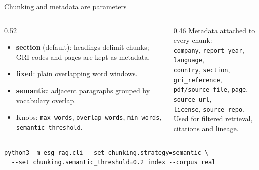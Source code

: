 \documentclass[aspectratio=169]{beamer}
\begin{document}
\begin{frame}[fragile]{Chunking and metadata are parameters}
  \begin{columns}[T]
    \begin{column}{0.52\textwidth}
      \begin{itemize}
        \item \textbf{section} (default): headings delimit chunks; GRI codes and pages are kept as metadata.
        \item \textbf{fixed}: plain overlapping word windows.
        \item \textbf{semantic}: adjacent paragraphs grouped by vocabulary overlap.
        \item Knobs: \texttt{max\_words}, \texttt{overlap\_words}, \texttt{min\_words}, \texttt{semantic\_threshold}.
      \end{itemize}
    \end{column}
    \begin{column}{0.46\textwidth}
      \scriptsize
      Metadata attached to every chunk:\\
      \texttt{company}, \texttt{report\_year}, \texttt{language},\\
      \texttt{country}, \texttt{section}, \texttt{gri\_reference},\\
      \texttt{pdf/source file}, \texttt{page}, \texttt{source\_url},\\
      \texttt{license}, \texttt{source\_repo}.\\
      \vspace{2mm}
      Used for filtered retrieval, citations and lineage.
    \end{column}
  \end{columns}
  \vspace{2mm}
  \begin{lstlisting}
python3 -m esg_rag.cli --set chunking.strategy=semantic \
  --set chunking.semantic_threshold=0.2 index --corpus real
  \end{lstlisting}
\end{frame}
\end{document}
